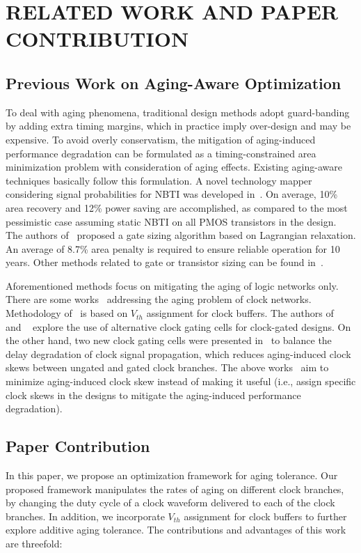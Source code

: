 \chapter{RELATED WORK AND PAPER CONTRIBUTION}
\label{sec:related}
\section{Previous Work on Aging-Aware Optimization}
\label{subsec:rw}
To deal with aging phenomena, traditional design methods adopt guard-banding by adding extra timing margins, which in practice imply over-design and may be expensive. To avoid overly conservatism, the mitigation of aging-induced performance degradation can be formulated as a timing-constrained area minimization problem with consideration of aging effects. Existing aging-aware techniques basically follow this formulation. A novel technology mapper considering signal probabilities for NBTI was developed in~\cite{kumar2007nbti}. On average, 10\% area recovery and 12\% power saving are accomplished, as compared to the most pessimistic case assuming static NBTI on all PMOS transistors in the design. The authors of~\cite{paul2006temporal} proposed a gate sizing algorithm based on Lagrangian relaxation. An average of 8.7\% area penalty is required to ensure reliable operation for 10 years. Other methods related to gate or transistor sizing can be found in~\cite{wang2007efficient, yang2007combating}.

Aforementioned methods focus on mitigating the aging of logic networks only. There are some works~\cite{huang2013low, chakraborty2013skew,chen2013novel} addressing the aging problem of clock networks. Methodology of~\cite{chen2013novel} is based on $V_{th}$ assignment for clock buffers. The authors of ~\cite{huang2013low} and ~\cite{chakraborty2013skew} explore the use of alternative clock gating cells for clock-gated designs. On the other hand, two new clock gating cells were presented in~\cite{lai2014bti} to balance the delay degradation of clock signal propagation, which reduces aging-induced clock skews between ungated and gated clock branches. The above works~\cite{huang2013low, chakraborty2013skew,chen2013novel,lai2014bti} aim to minimize aging-induced clock skew instead of making it useful (i.e., assign specific clock skews in the designs to mitigate the aging-induced performance degradation).


\section{Paper Contribution}
\label{subsec:pc}
In this paper, we propose an optimization framework for aging tolerance. Our proposed framework manipulates the rates of aging on different clock branches, by changing the duty cycle of a clock waveform delivered to each of the clock branches. In addition, we incorporate $V_{th}$ assignment for clock buffers to further explore additive aging tolerance. The contributions and advantages of this work are threefold:


